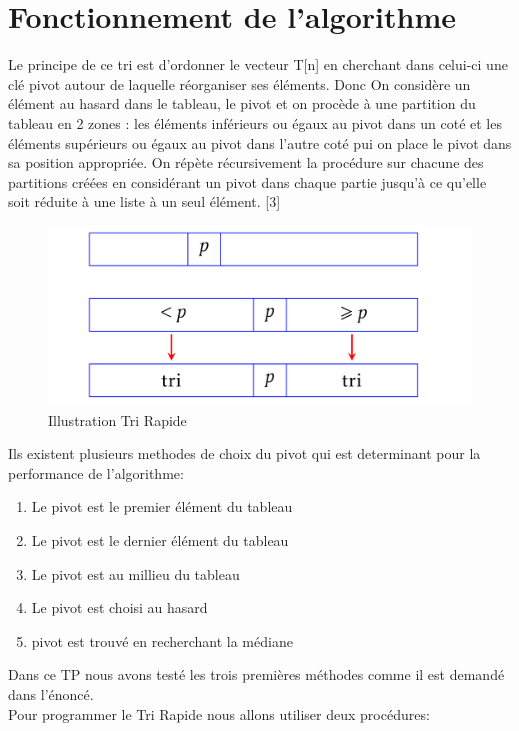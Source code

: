 \section{Fonctionnement de l'algorithme}
Le principe de ce tri est d’ordonner le vecteur T[n] en cherchant dans celui-ci une clé pivot autour de laquelle réorganiser ses éléments. Donc On considère un élément au hasard dans le tableau, le pivot et on procède à une partition du tableau en 2 zones : les éléments inférieurs ou égaux au pivot dans un coté et les éléments supérieurs ou égaux au pivot
dans l'autre coté pui on place le pivot dans sa position appropriée. On répète récursivement la procédure sur chacune des partitions créées en considérant un pivot dans chaque partie jusqu’à ce qu’elle soit réduite à une liste à un seul élément. [3]
\begin{figure} [H]
        \centering
        \includegraphics[scale=0.4]{ressources/tri_rapide.PNG}
        \caption{Illustration Tri Rapide }
        \label{fig:rapide}
     \end{figure}
Ils existent plusieurs methodes de choix du pivot qui est determinant pour la performance de l'algorithme:
\begin{enumerate}
    \item Le pivot est le premier élément du tableau
    \item Le pivot est le dernier élément du tableau
    \item Le pivot est au millieu du tableau
    \item Le pivot est choisi au hasard
    \item pivot est trouvé en recherchant la médiane
\end{enumerate}
Dans ce TP nous avons testé les trois premières méthodes comme il est demandé dans l'énoncé.\\
Pour programmer le Tri Rapide nous allons utiliser deux procédures:

